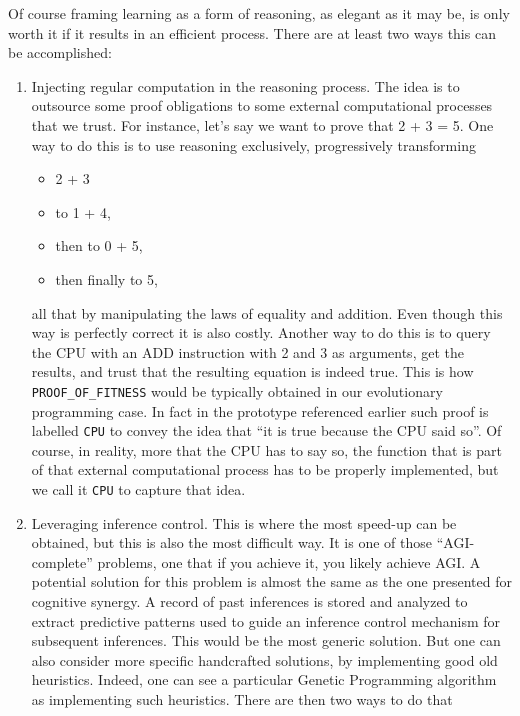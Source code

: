 \documentclass[]{report}
\begin{document}
Of course framing learning as a form of reasoning, as elegant as it
may be, is only worth it if it results in an efficient process.  There
are at least two ways this can be accomplished:
\begin{enumerate}
\item Injecting regular computation in the reasoning process.  The idea
is to outsource some proof obligations to some external computational
processes that we trust.  For instance, let's say we want to prove
that 2 + 3 = 5.  One way to do this is to use reasoning exclusively,
progressively transforming
\begin{itemize}
\item 2 + 3
\item to 1 + 4,
\item then to 0 + 5,
\item then finally to 5,
\end{itemize}
all that by manipulating the laws of equality and addition.  Even
though this way is perfectly correct it is also costly.  Another way
to do this is to query the CPU with an ADD instruction with 2 and 3 as
arguments, get the results, and trust that the resulting equation is
indeed true.  This is how \texttt{PROOF_OF_FITNESS} would
be typically obtained in our evolutionary programming case.  In fact
in the prototype referenced earlier such proof is
labelled \texttt{CPU} to convey the idea that ``it is true
because the CPU said so''.  Of course, in reality, more that the CPU
has to say so, the function that is part of that external
computational process has to be properly implemented, but we call
it \texttt{CPU} to capture that idea.
\item Leveraging inference control.  This is where the most speed-up can
   be obtained, but this is also the most difficult way.  It is one of
   those ``AGI-complete'' problems, one that if you achieve it, you
   likely achieve AGI.  A potential solution for this problem is
   almost the same as the one presented for cognitive synergy.  A
   record of past inferences is stored and analyzed to extract
   predictive patterns used to guide an inference control mechanism
   for subsequent inferences.  This would be the most generic
   solution.  But one can also consider more specific handcrafted
   solutions, by implementing good old heuristics.  Indeed, one can
   see a particular Genetic Programming algorithm as implementing such
   heuristics.  There are then two ways to do that
   \begin{enumerate}

\end{enumerate}
\end{enumerate}
\end{document}
